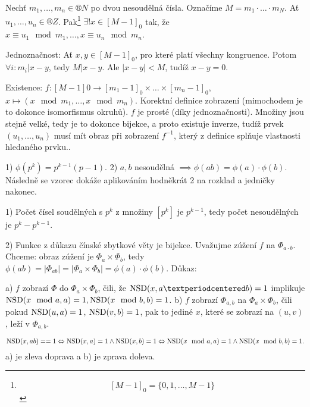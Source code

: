 \documentclass[12pt]{article}                   %
\begin{document}
        \begin{veta}
            Nechť $m_1, …, m_n \in ®N$ po dvou nesoudělná čísla. Označíme $M = m_1·…·m_N$. Ať $u_1, …, u_n \in ®Z$. Pak\footnote{$$ [M-1]_0 = \{0, 1, …, M-1\} $$ } $\exists! x \in [M-1]_0$ tak, že $x ≡ u_1 \mod m_1, …, x ≡ u_n \mod m_n$.

            \begin{dukazin}
                Jednoznačnost: Ať $x, y \in [M-1]_0$, pro které platí všechny kongruence. Potom $\forall i: m_i | x - y$, tedy $M | x - y$. Ale $|x - y| < M$, tudíž $x - y = 0$.

                Existence: $f: [M-1]0 \rightarrow [m_1-1]_0 \times … \times [m_n - 1]_0$, $x \mapsto (x \mod m_1, …, x \mod m_n)$. Korektní definice zobrazení (mimochodem je to dokonce isomorfismus okruhů). $f$ je prosté (díky jednoznačnosti). Množiny jsou stejně velké, tedy je to dokonce bijekce, a proto existuje inverze, tudíž prvek $(u_1, …, u_n)$ musí mít obraz při zobrazení $f^{-1}$, který z definice splňuje vlastnosti hledaného prvku..
            \end{dukazin}
        \end{veta}

        \begin{dukaz}
            1) $\phi(p^k) = p^{k-1}(p-1)$. 2) $a, b$ nesoudělná $\implies \phi(ab) = \phi(a)·\phi(b)$. Následně se vzorec dokáže aplikováním hodněkrát 2 na rozklad a jedničky nakonec.

            1) Počet čísel soudělných s $p^k$ z množiny $[p^k]$ je $p^{k-1}$, tedy počet nesoudělných je $p^k - p^{k-1}$.

            2) Funkce z důkazu čínské zbytkové věty je bijekce. Uvažujme zúžení $f$ na $\Phi_{a·b}$. Chceme: obraz zúžení je $\Phi_a \times \Phi_b$, tedy $\phi(ab) = |\Phi_{ab}| = |\Phi_a \times \Phi_b| = \phi(a)·\phi(b)$. Důkaz:

            a) $f$ zobrazí $\Phi$ do $\Phi_a \times \Phi_b$, čili, že $\NSD(x, a·b) = 1$ implikuje $\operatorname{NSD}(x \mod a, a) = 1, \operatorname{NSD}(x \mod b, b) = 1$. b) $f$ zobrazí $\Phi_{a, b}$ na $\Phi_a \times \Phi_b$, čili pokud $\operatorname{NSD}(u, a) = 1$, $\operatorname{NSD}(v, b) = 1$, pak to jediné $x$, které se zobrazí na $(u, v)$, leží v $\Phi_{a, b}$.

            $$ \operatorname{NSD}(x, ab) == 1 \Leftrightarrow \operatorname{NSD}(x, a) = 1 \land \operatorname{NSD}(x, b) = 1 \Leftrightarrow \operatorname{NSD}(x \mod a, a) = 1 \land \operatorname{NSD}(x \mod b, b) = 1. $$ 
            a) je zleva doprava a b) je zprava doleva.
        \end{dukaz}
\end{document}
